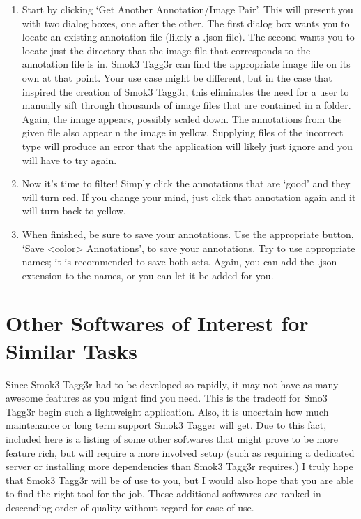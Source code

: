 \documentclass{article}
\begin{document}
\begin{enumerate}
  \item Start by clicking `Get Another Annotation/Image Pair'. This will present you with two dialog boxes, one after the other. The first dialog box wants you to locate an existing annotation file (likely a .json file). The second wants you to locate just the directory that the image file that corresponds to the annotation file is in. Smok3 Tagg3r can find the appropriate image file on its own at that point. Your use case might be different, but in the case that inspired the creation of Smok3 Tagg3r, this eliminates the need for a user to manually sift through thousands of image files that are contained in a folder. Again, the image appears, possibly scaled down. The annotations from the given file also appear n the image in yellow. Supplying files of the incorrect type will produce an error that the application will likely just ignore and you will have to try again.

  \item Now it's time to filter! Simply click the annotations that are `good' and they will turn red. If you change your mind, just click that annotation again and it will turn back to yellow.

  \item When finished, be sure to save your annotations. Use the appropriate button, `Save <color> Annotations', to save your annotations. Try to use appropriate names; it is recommended to save both sets. Again, you can add the .json extension to the names, or you can let it be added for you.
\end{enumerate}

\section{Other Softwares of Interest for Similar Tasks}
Since Smok3 Tagg3r had to be developed so rapidly, it may not have as many awesome features as you might find you need. This is the tradeoff for Smo3 Tagg3r begin such a lightweight application. Also, it is uncertain how much maintenance or long term support Smok3 Tagger will get. Due to this fact, included here is a listing of some other softwares that might prove to be more feature rich, but will require a more involved setup (such as requiring a dedicated server or installing more dependencies than Smok3 Tagg3r requires.) I truly hope that Smok3 Tagg3r will be of use to you, but I would also hope that you are able to find the right tool for the job. These additional softwares are ranked in descending order of quality without regard for ease of use.\\
\end{document}
